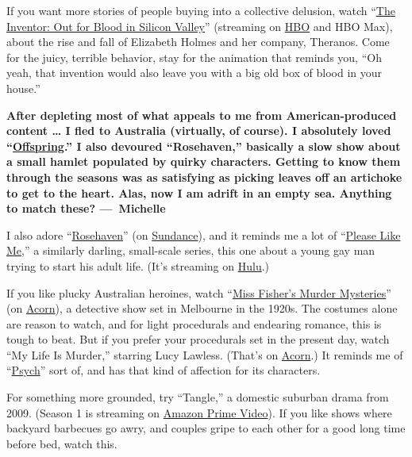 If you want more stories of people buying into a collective delusion,
watch
``\href{https://www.nytimes3xbfgragh.onion/2019/03/18/arts/television/theranos-elizabeth-holmes.html}{The
Inventor: Out for Blood in Silicon Valley}'' (streaming on
\href{https://www.hbo.com/documentaries/the-inventor-out-for-blood-in-silicon-valley}{HBO}
and HBO Max), about the rise and fall of Elizabeth Holmes and her
company, Theranos. Come for the juicy, terrible behavior, stay for the
animation that reminds you, ``Oh yeah, that invention would also leave
you with a big old box of blood in your house.''

\textbf{After depleting most of what appeals to me from
American-produced content \ldots{} I fled to Australia (virtually, of
course). I absolutely loved
``\href{https://www.netflix.com/title/80118289}{Offspring}.'' I also
devoured ``Rosehaven,'' basically a slow show about a small hamlet
populated by quirky characters. Getting to know them through the seasons
was as satisfying as picking leaves off an artichoke to get to the
heart. Alas, now I am adrift in an empty sea. Anything to match these?
---~Michelle}

I also adore
``\href{https://www.nytimes3xbfgragh.onion/watching/titles/rosehaven}{Rosehaven}''
(on \href{https://www.sundancetv.com/shows/rosehaven--27554}{Sundance}),
and it reminds me a lot of
``\href{https://www.nytimes3xbfgragh.onion/watching/recommendations/please-like-me}{Please
Like Me},'' a similarly darling, small-scale series, this one about a
young gay man trying to start his adult life. (It's streaming on
\href{https://www.hulu.com/series/please-like-me-172a0482-c365-4225-935e-255d45314c52}{Hulu}.)

If you like plucky Australian heroines, watch
``\href{https://www.nytimes3xbfgragh.onion/watching/recommendations/miss-fishers-murder-mysteries}{Miss
Fisher's Murder Mysteries}'' (on
\href{https://acorn.tv/missfisher/}{Acorn}), a detective show set in
Melbourne in the 1920s. The costumes alone are reason to watch, and for
light procedurals and endearing romance, this is tough to beat. But if
you prefer your procedurals set in the present day, watch ``My Life Is
Murder,'' starring Lucy Lawless. (That's on
\href{https://acorn.tv/mylifeismurder/}{Acorn}.) It reminds me of
``\href{https://www.nytimes3xbfgragh.onion/watching/recommendations/watching-tv-psych}{Psych}''
sort of, and has that kind of affection for its characters.

For something more grounded, try ``Tangle,'' a domestic suburban drama
from 2009. (Season 1 is streaming on
\href{https://www.amazon.com/Tangle/dp/B07TSB82WF}{Amazon Prime Video}).
If you like shows where backyard barbecues go awry, and couples gripe to
each other for a good long time before bed, watch this.

